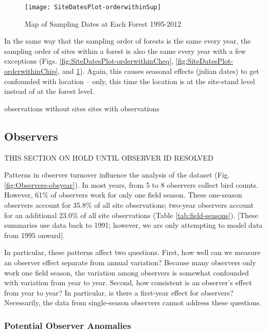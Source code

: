 \begin{figure}
\texttt{[image: SiteDatesPlot-orderwithinSup]}
\caption{Map of Sampling Dates at Each Forest 1995-2012}
\label{fig:SiteDatesPlot-orderwithinSup}
\end{figure}

In the same way that the sampling order of forests is the same every year, the sampling order of sites within a forest is also the same every year with a few exceptions (Figs. \ref{fig:SiteDatesPlot-orderwithinCheq}, \ref{fig:SiteDatesPlot-orderwithinChip}, and \ref{fig:SiteDatesPlot-orderwithinSup}).  Again, this causes seasonal effects (julian dates) to get confounded with location -- only, this time the location is at the site-stand level instead of at the forest level.


observations without sites
sites with observations



\subsection{Observers}

THIS SECTION ON HOLD UNTIL OBSERVER ID RESOLVED

Patterns in observer turnover influence the analysis of the dataset (Fig. \ref{fig:Observers-obsyear}).  In most years, from 5 to 8 observers collect bird counts.  However, 61\% of observers work for only one field season.  These one-season observers account for 35.8\% of all site observations; two-year observers account for an additional 23.0\% of all site observations (Table \ref{tab:field-seasons}).  [These summaries use data back to 1991; however, we are only attempting to model data from 1995 onward].



In particular, these patterns affect two questions.  First, how well can we measure an observer effect separate from annual variation?  Because many observers only work one field season, the variation among observers is somewhat confounded with variation from year to year.  Second, how consistent is an observer's effect from year to year?  In particular, is there a first-year effect for observers?  Necessarily, the data from single-season observers cannot address these questions.

\subsubsection{Potential Observer Anomalies}

